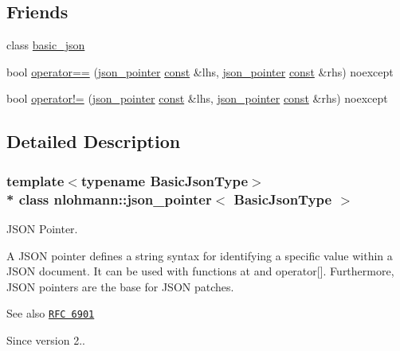 \subsection*{Friends}
\begin{DoxyCompactItemize}
\item 
class \hyperlink{classnlohmann_1_1json__pointer_ada3100cdb8700566051828f1355fa745}{basic\+\_\+json}
\item 
bool \hyperlink{classnlohmann_1_1json__pointer_a4667ef558c8c3f8a646bfda0c6654653}{operator==} (\hyperlink{classnlohmann_1_1json__pointer}{json\+\_\+pointer} \hyperlink{functions__c_8js_afacfd9c985d225bb07483b887a801b6f}{const} \&lhs, \hyperlink{classnlohmann_1_1json__pointer}{json\+\_\+pointer} \hyperlink{functions__c_8js_afacfd9c985d225bb07483b887a801b6f}{const} \&rhs) noexcept
\item 
bool \hyperlink{classnlohmann_1_1json__pointer_a6779edcf28e6f018a3bbb29c0b4b5e1e}{operator!=} (\hyperlink{classnlohmann_1_1json__pointer}{json\+\_\+pointer} \hyperlink{functions__c_8js_afacfd9c985d225bb07483b887a801b6f}{const} \&lhs, \hyperlink{classnlohmann_1_1json__pointer}{json\+\_\+pointer} \hyperlink{functions__c_8js_afacfd9c985d225bb07483b887a801b6f}{const} \&rhs) noexcept
\end{DoxyCompactItemize}


\subsection{Detailed Description}
\subsubsection*{template$<$typename Basic\+Json\+Type$>$\\*
class nlohmann\+::json\+\_\+pointer$<$ Basic\+Json\+Type $>$}

J\+S\+ON Pointer. 

A J\+S\+ON pointer defines a string syntax for identifying a specific value within a J\+S\+ON document. It can be used with functions {\ttfamily at} and {\ttfamily operator\mbox{[}\mbox{]}}. Furthermore, J\+S\+ON pointers are the base for J\+S\+ON patches.

\begin{DoxySeeAlso}{See also}
\href{https://tools.ietf.org/html/rfc6901}{\tt R\+FC 6901}
\end{DoxySeeAlso}
\begin{DoxySince}{Since}
version 2.. 
\end{DoxySince}


